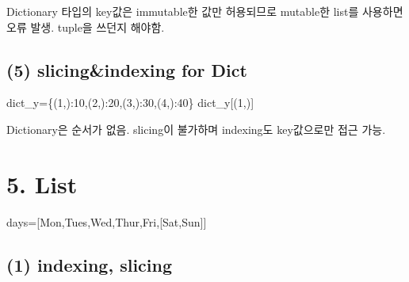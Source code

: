 \documentclass[
  letterpaper,
  DIV=11,
  numbers=noendperiod]{scrreprt}
\newenvironment{Shaded}{\begin{snugshade}}{\end{snugshade}}
\newcommand{\DecValTok}[1]{\textcolor[rgb]{0.68,0.00,0.00}{#1}}
\newcommand{\NormalTok}[1]{\textcolor[rgb]{0.00,0.23,0.31}{#1}}
\newcommand{\OperatorTok}[1]{\textcolor[rgb]{0.37,0.37,0.37}{#1}}
\newcommand{\StringTok}[1]{\textcolor[rgb]{0.13,0.47,0.30}{#1}}
\begin{document}
Dictionary 타입의 key값은 immutable한 값만 허용되므로 mutable한 list를
사용하면 오류 발생. tuple을 쓰던지 해야함.

\subsection*{(5) slicing\&indexing for
Dict}\label{slicingindexing-for-dict}

\begin{Shaded}
\begin{Highlighting}[]
\NormalTok{dict\_y}\OperatorTok{=}\NormalTok{\{(}\DecValTok{1}\NormalTok{,):}\DecValTok{10}\NormalTok{,(}\DecValTok{2}\NormalTok{,):}\DecValTok{20}\NormalTok{,(}\DecValTok{3}\NormalTok{,):}\DecValTok{30}\NormalTok{,(}\DecValTok{4}\NormalTok{,):}\DecValTok{40}\NormalTok{\}}
\NormalTok{dict\_y[(}\DecValTok{1}\NormalTok{,)]}
\end{Highlighting}
\end{Shaded}

Dictionary은 순서가 없음. slicing이 불가하며 indexing도 key값으로만 접근
가능.

\section*{5. List}\label{list}


\begin{Shaded}
\begin{Highlighting}[]
\NormalTok{days}\OperatorTok{=}\NormalTok{[}\StringTok{\textquotesingle{}Mon\textquotesingle{}}\NormalTok{,}\StringTok{\textquotesingle{}Tues\textquotesingle{}}\NormalTok{,}\StringTok{\textquotesingle{}Wed\textquotesingle{}}\NormalTok{,}\StringTok{\textquotesingle{}Thur\textquotesingle{}}\NormalTok{,}\StringTok{\textquotesingle{}Fri\textquotesingle{}}\NormalTok{,[}\StringTok{\textquotesingle{}Sat\textquotesingle{}}\NormalTok{,}\StringTok{\textquotesingle{}Sun\textquotesingle{}}\NormalTok{]]}
\end{Highlighting}
\end{Shaded}

\subsection*{(1) indexing, slicing}\label{indexing-slicing}
\end{document}
